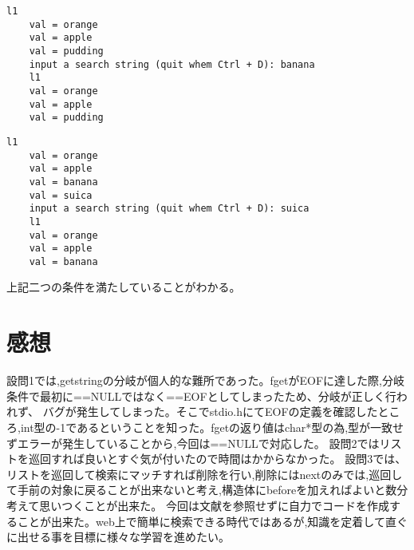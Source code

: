 \documentclass[fontsize = 10pt, paper= a4,twocolumn,column_gap=3zw]{jlreq}
\begin{document}
\begin{lstlisting}[basicstyle=\ttfamily\footnotesize, frame=single, caption=test10,label=test10]
    l1
    val = orange
    val = apple
    val = pudding
    input a search string (quit whem Ctrl + D): banana
    l1
    val = orange
    val = apple
    val = pudding    
\end{lstlisting}

\begin{lstlisting}[basicstyle=\ttfamily\footnotesize, frame=single, caption=test10,label=test10]
    l1
    val = orange
    val = apple
    val = banana
    val = suica
    input a search string (quit whem Ctrl + D): suica
    l1
    val = orange
    val = apple
    val = banana    
\end{lstlisting}


上記二つの条件を満たしていることがわかる。

\section{感想}
設問1では,getstringの分岐が個人的な難所であった。fgetがEOFに達した際,分岐条件で最初に==NULLではなく==EOFとしてしまったため、分岐が正しく行われず、
バグが発生してしまった。そこでstdio.hにてEOFの定義を確認したところ,int型の-1であるということを知った。fgetの返り値はchar*型の為,型が一致せずエラーが発生していることから,今回は==NULLで対応した。
設問2ではリストを巡回すれば良いとすぐ気が付いたので時間はかからなかった。
設問3では、リストを巡回して検索にマッチすれば削除を行い,削除にはnextのみでは,巡回して手前の対象に戻ることが出来ないと考え,構造体にbeforeを加えればよいと数分考えて思いつくことが出来た。
今回は文献を参照せずに自力でコードを作成することが出来た。web上で簡単に検索できる時代ではあるが,知識を定着して直ぐに出せる事を目標に様々な学習を進めたい。



\end{document}
